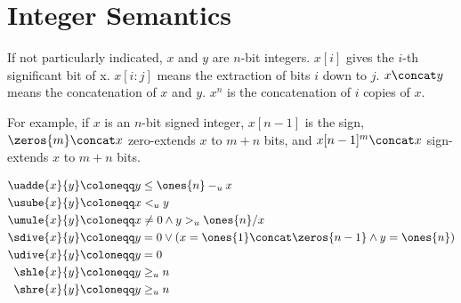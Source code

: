 \section{Integer Semantics}
\label{s:sema}

If not particularly indicated, $x$ and $y$ are $n$-bit integers.
$x[i]$ gives the $i$-th significant bit of x.  $x[i:j]$ means the
extraction of bits $i$ down to $j$.  $x \concat y$ means the
concatenation of $x$ and $y$.  $x^n$ is the concatenation of $i$
copies of $x$.

For example, if $x$ is an $n$-bit signed integer, $x[n-1]$ is the
sign, $\zeros{m}\concat x$ zero-extends $x$ to $m+n$ bits, and
$x[n-1]^m\concat x$ sign-extends $x$ to $m+n$ bits.

\begin{align}
\uadde{x}{y}&\coloneqq
y \leq \ones{n} -_u x
\\
%
\usube{x}{y}&\coloneqq
x <_u y
\\
\umule{x}{y}&\coloneqq
x \neq 0 \land y >_u \ones{n} / x
\\
\sdive{x}{y}&\coloneqq
y = 0 \lor (x = \ones{1}\concat\zeros{n-1} \land y = \ones{n})
\\
\udive{x}{y}&\coloneqq
y = 0
\\
\shle{x}{y}&\coloneqq
y \geq_u n
\\
\shre{x}{y}&\coloneqq
y \geq_u n
\end{align}

